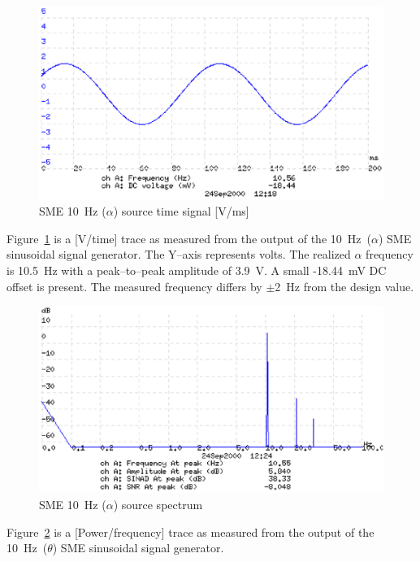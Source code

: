 \begin{figure}[htbp]
\begin{center}
	\includegraphics[width=\textwidth]{SME101.ps}
    \caption{SME 10~Hz ($\alpha$) source time signal [V/ms]}
    \label{fig:sme10-1}
\end{center}
\end{figure}

Figure~\ref{fig:sme10-1} is a [V/time] trace as measured from the
output of the 10~Hz~($\alpha$) SME sinusoidal signal generator. The
Y--axis represents volts. The realized $\alpha$ frequency is 10.5~Hz
with a peak--to--peak amplitude of 3.9~V. A small -18.44~mV DC offset
is present. The measured frequency differs by $\pm$2~Hz from the
design value.

\begin{figure}[htbp]
\begin{center}
	\includegraphics[width=\textwidth]{SME102.ps}
    \caption{SME 10~Hz ($\alpha$) source spectrum}
    \label{fig:sme10-2}
\end{center}
\end{figure}


Figure~\ref{fig:sme10-2} is a [Power/frequency] trace as measured from
the output of the 10~Hz~($\theta$) SME sinusoidal signal generator.

